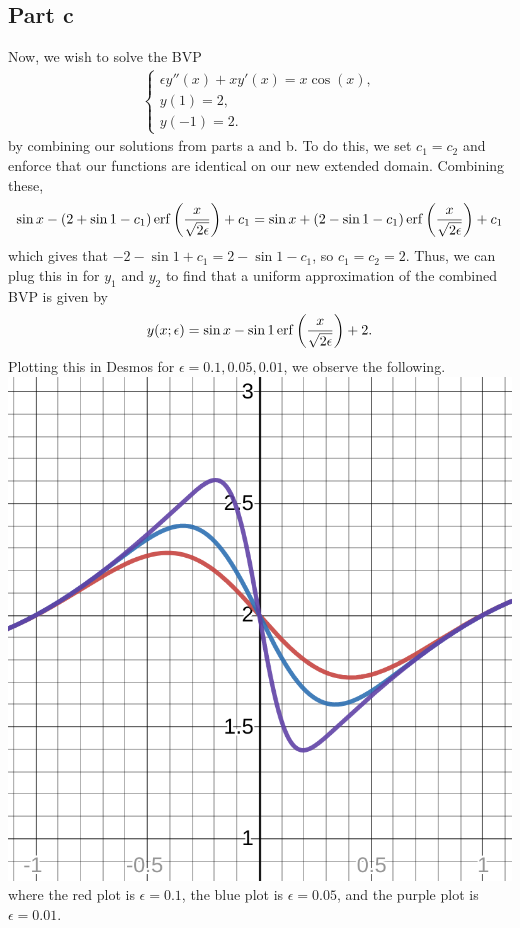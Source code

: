\documentclass{article}
\begin{document}
\subsection{Part c}
Now, we wish to solve the BVP 
\begin{align*}
    \begin{cases} \epsilon y''(x) + x y'(x) = x \cos(x),\\
      y(1) = 2,\\
      y(-1) = 2. \end{cases}
  \end{align*}
by combining our solutions from parts a and b. To do this, we set $c_1=c_2$ and enforce that our functions are identical on our new extended domain. Combining these,
\[
\sin x-(2+\sin1-c_1)\operatorname{erf}\left(\frac{x}{\sqrt{2\epsilon}}\right)+c_1=\sin x+(2-\sin1-c_1)\operatorname{erf}\left(\frac{x}{\sqrt{2\epsilon}}\right)+c_1
\]
which gives that $-2-\sin1+c_1=2-\sin1-c_1$, so $c_1=c_2=2$. Thus, we can plug this in for $y_1$ and $y_2$ to find that a uniform approximation of the combined BVP is given by
\[
y(x;\epsilon)=\sin x-\sin1\operatorname{erf}\left(\frac{x}{\sqrt{2\epsilon}}\right)+2.
\]
Plotting this in Desmos for $\epsilon = 0.1, 0.05, 0.01$, we observe the following. \\
\includegraphics[scale=0.5]{desmos-graph.png}\\
where the red plot is $\epsilon=0.1$, the blue plot is $\epsilon=0.05$, and the purple plot is $\epsilon=0.01$.
\end{document}
